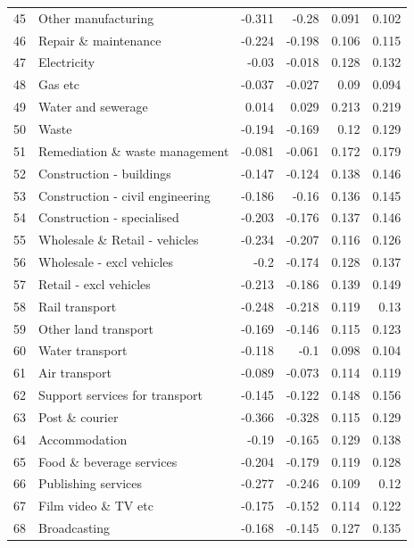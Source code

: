 \begin{longtable}{@{\extracolsep{\fill}}rlrrrr@{}}
    45    & Other manufacturing & -0.311 & -0.28 & 0.091 & 0.102 \\
    46    & Repair \& maintenance & -0.224 & -0.198 & 0.106 & 0.115 \\
    47    & Electricity & -0.03 & -0.018 & 0.128 & 0.132 \\
    48    & Gas etc & -0.037 & -0.027 & 0.09  & 0.094 \\
    49    & Water and sewerage & 0.014 & 0.029 & 0.213 & 0.219 \\
    50    & Waste & -0.194 & -0.169 & 0.12  & 0.129 \\
    51    & Remediation \& waste management & -0.081 & -0.061 & 0.172 & 0.179 \\
    52    & Construction - buildings & -0.147 & -0.124 & 0.138 & 0.146 \\
    53    & Construction - civil engineering & -0.186 & -0.16 & 0.136 & 0.145 \\
    54    & Construction - specialised & -0.203 & -0.176 & 0.137 & 0.146 \\
    55    & Wholesale \& Retail - vehicles & -0.234 & -0.207 & 0.116 & 0.126 \\
    56    & Wholesale - excl vehicles & -0.2  & -0.174 & 0.128 & 0.137 \\
    57    & Retail - excl vehicles & -0.213 & -0.186 & 0.139 & 0.149 \\
    58    & Rail transport & -0.248 & -0.218 & 0.119 & 0.13 \\
    59    & Other land transport & -0.169 & -0.146 & 0.115 & 0.123 \\
    60    & Water transport & -0.118 & -0.1  & 0.098 & 0.104 \\
    61    & Air transport & -0.089 & -0.073 & 0.114 & 0.119 \\
    62    & Support services for transport & -0.145 & -0.122 & 0.148 & 0.156 \\
    63    & Post \& courier & -0.366 & -0.328 & 0.115 & 0.129 \\
    64    & Accommodation & -0.19 & -0.165 & 0.129 & 0.138 \\
    65    & Food \& beverage services & -0.204 & -0.179 & 0.119 & 0.128 \\
    66    & Publishing services & -0.277 & -0.246 & 0.109 & 0.12 \\
    67    & Film video \& TV etc & -0.175 & -0.152 & 0.114 & 0.122 \\
    68    & Broadcasting & -0.168 & -0.145 & 0.127 & 0.135 \\

\end{longtable}
